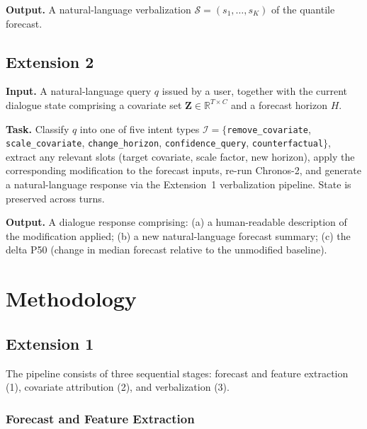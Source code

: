 \documentclass[conference]{IEEEtran}
\begin{document}
\vspace{2mm}

\textbf{Output.}
A natural-language verbalization $\mathcal{S} = (s_1, \dots, s_K)$ of the quantile forecast.

\subsection{Extension 2}

\textbf{Input.}
A natural-language query $q$ issued by a user, together with the current dialogue state comprising a covariate set $\mathbf{Z} \in \mathbb{R}^{T \times C}$ and a forecast horizon $H$.

\vspace{2mm}

\textbf{Task.}
Classify $q$ into one of five intent types $\mathcal{I} = \{$\texttt{remove\_covariate}, \texttt{scale\_covariate}, \texttt{change\_horizon}, \texttt{confidence\_query}, \texttt{counterfactual}$\}$, extract any relevant slots (target covariate, scale factor, new horizon), apply the corresponding modification to the forecast inputs, re-run Chronos-2, and generate a natural-language response via the Extension~1 verbalization pipeline. State is preserved across turns.

\vspace{2mm}

\textbf{Output.}
A dialogue response comprising: (a) a human-readable description of the modification applied; (b) a new natural-language forecast summary; (c) the delta P50 (change in median forecast relative to the unmodified baseline).

\section{Methodology}

\subsection{Extension 1}

The pipeline consists of three sequential stages: forecast and feature extraction (1), covariate attribution (2), and verbalization (3).

\subsubsection{Forecast and Feature Extraction}
\end{document}
